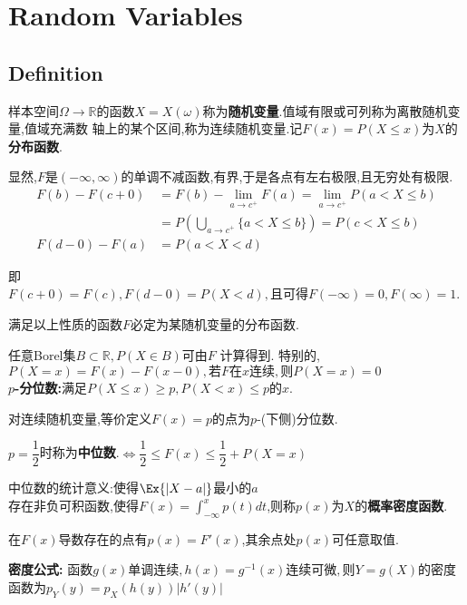 
\section{Random Variables}
\subsection{Definition}
样本空间$ \Omega \rightarrow \mathbb{R}$的函数$ X = X(\omega)$称为\textbf{随机变量}.值域有限或可列称为离散随机变量,值域充满数
轴上的某个区间,称为连续随机变量.记$ F(x) = P(X \le x)$为$ X$的\textbf{分布函数}.

显然,$ F$是$ (-\infty, \infty)$的单调不减函数,有界,于是各点有左右极限,且无穷处有极限.
\begin{equation*}
	\begin{split}
		F(b) - F(c + 0) & = F(b) - \lim \limits_{a \to c^{+}} F(a) =\lim \limits_{a \to c^{+}}P(a < X \le b) \\
		                & = P(\bigcup_{a \to c^{+}}\{a < X \le b\}) = P(c < X \le b)                         \\
		F(d - 0) - F(a) & = P(a < X < d)
	\end{split}
\end{equation*}

即$ F(c + 0) = F(c), F(d - 0) = P(X<d), 且可得F(-\infty) = 0, F(\infty) = 1$.

满足以上性质的函数$ F$必定为某随机变量的分布函数.

任意Borel集$ B\subset \mathbb{R}, P(X \in B) 可由F$ 计算得到.
特别的,$ P(X=x) = F(x) - F(x - 0),若F在x连续,则P(X=x) = 0$
\\

\textbf{$p$-分位数:}满足$ P(X \le x) \ge p, P(X <x) \le p 的x. $

对连续随机变量,等价定义$F(x) = p$的点为$p$-(下侧)分位数.

$ p =\dfrac{1}{2}$时称为\textbf{中位数}.$\Leftrightarrow \dfrac{1}{2} \le F(x) \le \dfrac{1}{2} + P(X=x) $

中位数的统计意义:使得$\Ex{|X-a|}$最小的$a$
\\

存在非负可积函数,使得$ F(x) = \int_{-\infty}^{x}{p(t)dt}$,则称$ p(x)$为$ X$的\textbf{概率密度函数}.

在$ F(x)$导数存在的点有$ p(x) = F'(x)$,其余点处$ p(x)$可任意取值.

\textbf{密度公式:}
函数$g(x)单调连续,h(x) = g^{-1}(x)连续可微,则Y = g(X)$的密度函数为$ p_Y(y) = p_X(h(y))|h'(y)|$

